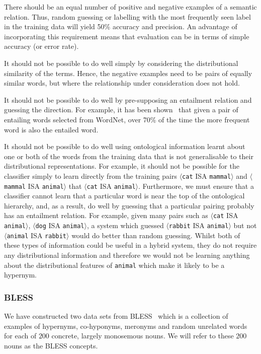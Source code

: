 \documentclass[11pt]{article}
\newcommand\pair[2]{$\langle$\texttt{#1} ISA \texttt{#2}$\rangle$}
\begin{document}
There should be an equal number of positive and negative examples of a semantic relation.  Thus, random guessing or labelling with the most frequently seen label in the training data will yield 50\% accuracy and precision.  An advantage of incorporating this requirement means that evaluation can be in terms of simple accuracy (or error rate).

It should not be possible to do well simply by considering the distributional similarity of the terms.  Hence, the negative examples need to be pairs of equally similar words, but where the relationship under consideration does not hold.

It should not be possible to do well by pre-supposing an entailment relation and guessing the direction.  For example, it has been shown~\cite{Weeds2004} that given a pair of entailing words selected from WordNet, over 70\% of the time the more frequent word is also the entailed word.

It should not be possible to do well using ontological information learnt about one or both of the words from the training data that is not generalisable to their distributional representations.  For example, it should not be possible for the classifier simply to learn directly from the training pairs \pair{cat}{mammal} and \pair{mammal}{animal}  that \pair{cat}{animal}.  Furthermore, we must ensure that a classifier cannot learn that a particular word is near the top of the ontological hierarchy, and, as a result, do well by guessing that a particular pairing probably has an entailment relation.  For example, given many pairs such as \pair{cat}{animal}, \pair{dog}{animal}, a system which guessed \pair{rabbit}{animal} but not \pair{animal}{rabbit} would do better than random guessing.  Whilst both of these types of information could be useful in a hybrid system, they do not require any distributional information and therefore we would not be learning anything about the distributional features of \texttt{animal} which make it likely to be a hypernym.

\subsubsection{BLESS}

We have constructed two  data sets from BLESS~\cite{Baroni2011} which is a collection of examples of hypernyms, co-hyponyms, meronyms and random unrelated words for each of $200$ concrete, largely monosemous nouns. We will refer to these $200$ nouns as the BLESS concepts.
\end{document}
